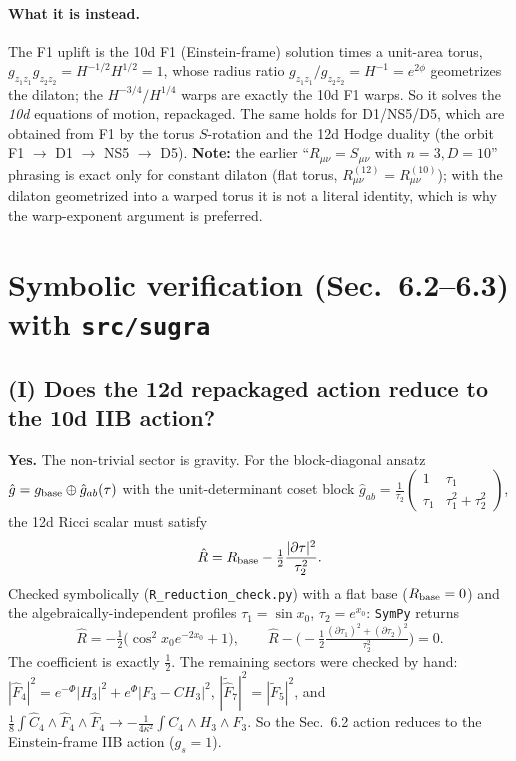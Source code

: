 \paragraph{What it is instead.}
The F1 uplift is the 10d F1 (Einstein-frame) solution times a unit-area torus,
$g_{z_1z_1}g_{z_2z_2}=H^{-1/2}H^{1/2}=1$, whose radius ratio $g_{z_1z_1}/g_{z_2z_2}=H^{-1}=e^{2\phi}$
geometrizes the dilaton; the $H^{-3/4}/H^{1/4}$ warps are exactly the 10d F1 warps. So it solves
the \emph{10d} equations of motion, repackaged. The same holds for D1/NS5/D5, which are obtained
from F1 by the torus $S$-rotation and the 12d Hodge duality (the orbit
F1 $\to$ D1 $\to$ NS5 $\to$ D5).
\textbf{Note:} the earlier ``$R_{\mu\nu}=S_{\mu\nu}$ with $n=3,D=10$'' phrasing is exact only for
constant dilaton (flat torus, $R^{(12)}_{\mu\nu}=R^{(10)}_{\mu\nu}$); with the dilaton geometrized
into a warped torus it is not a literal identity, which is why the warp-exponent argument is preferred.


\section*{Symbolic verification (Sec.~6.2--6.3) with \texttt{src/sugra}}

\subsection*{(I) Does the 12d repackaged action reduce to the 10d IIB action?}

\textbf{Yes.} The non-trivial sector is gravity. For the block-diagonal ansatz
$\hat g = g_{\rm base}\oplus\hat g_{ab}(\tau)$ with the unit-determinant coset block
$\hat g_{ab}=\tfrac{1}{\tau_2}\!\left(\begin{smallmatrix}1&\tau_1\\\tau_1&\tau_1^2+\tau_2^2\end{smallmatrix}\right)$,
the 12d Ricci scalar must satisfy
\begin{equation}
\hat R = R_{\rm base} - \tfrac12 \frac{|\partial\tau|^2}{\tau_2^2}.
\end{equation}
Checked symbolically (\texttt{R\_reduction\_check.py}) with a flat base ($R_{\rm base}=0$) and the
algebraically-independent profiles $\tau_1=\sin x_0$, $\tau_2=e^{x_0}$: \texttt{SymPy} returns
\[
\hat R = -\tfrac12\big(\cos^2 x_0 e^{-2x_0}+1\big),\qquad
\hat R - \Big(\!-\tfrac12\tfrac{(\partial\tau_1)^2+(\partial\tau_2)^2}{\tau_2^2}\Big) = 0 .
\]
The coefficient is exactly $\tfrac12$. The remaining sectors were checked by hand:
$|\hat F_4|^2 = e^{-\Phi}|H_3|^2+e^{\Phi}|F_3-CH_3|^2$,
$|\tilde{\hat F}_7|^2=|\tilde F_5|^2$, and
$\tfrac18\!\int\hat C_4\wedge\hat F_4\wedge\hat F_4 \to -\tfrac{1}{4\kappa^2}\!\int C_4\wedge H_3\wedge F_3$.
So the Sec.~6.2 action reduces to the Einstein-frame IIB action ($g_s=1$).

